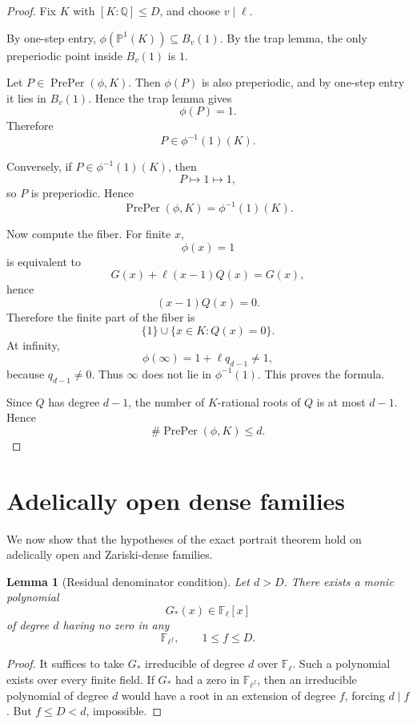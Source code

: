 \documentclass[11pt]{article}
\newtheorem{lemma}[theorem]{Lemma}
\begin{document}
\begin{proof}
Fix \(K\) with \([K:\mathbb Q]\le D\), and choose \(v\mid\ell\).

By one-step entry, \(\phi(\mathbb P^1(K))\subseteq B_v(1)\). By the trap lemma, the only preperiodic point inside \(B_v(1)\) is \(1\).

Let \(P\in\operatorname{PrePer}(\phi,K)\). Then \(\phi(P)\) is also preperiodic, and by one-step entry it lies in \(B_v(1)\). Hence the trap lemma gives
\[
\phi(P)=1.
\]
Therefore
\[
P\in \phi^{-1}(1)(K).
\]

Conversely, if \(P\in\phi^{-1}(1)(K)\), then
\[
P\mapsto1\mapsto1,
\]
so \(P\) is preperiodic. Hence
\[
\operatorname{PrePer}(\phi,K)=\phi^{-1}(1)(K).
\]

Now compute the fiber. For finite \(x\),
\[
\phi(x)=1
\]
is equivalent to
\[
G(x)+\ell(x-1)Q(x)=G(x),
\]
hence
\[
(x-1)Q(x)=0.
\]
Therefore the finite part of the fiber is
\[
\{1\}\cup\{x\in K:Q(x)=0\}.
\]
At infinity,
\[
\phi(\infty)=1+\ell q_{d-1}\ne1,
\]
because \(q_{d-1}\ne0\). Thus \(\infty\) does not lie in \(\phi^{-1}(1)\). This proves the formula.

Since \(Q\) has degree \(d-1\), the number of \(K\)-rational roots of \(Q\) is at most \(d-1\). Hence
\[
\#\operatorname{PrePer}(\phi,K)\le d.
\]
\end{proof}

\section{Adelically open dense families}

We now show that the hypotheses of the exact portrait theorem hold on adelically open and Zariski-dense families.

\begin{lemma}[Residual denominator condition]
Let \(d>D\). There exists a monic polynomial
\[
G_\ast(x)\in\mathbb F_\ell[x]
\]
of degree \(d\) having no zero in any
\[
\mathbb F_{\ell^f},
\qquad
1\le f\le D.
\]
\end{lemma}

\begin{proof}
It suffices to take \(G_\ast\) irreducible of degree \(d\) over \(\mathbb F_\ell\). Such a polynomial exists over every finite field. If \(G_\ast\) had a zero in \(\mathbb F_{\ell^f}\), then an irreducible polynomial of degree \(d\) would have a root in an extension of degree \(f\), forcing \(d\mid f\). But \(f\le D<d\), impossible.
\end{proof}
\end{document}
